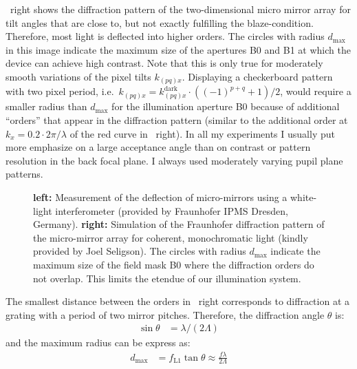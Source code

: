 ~right shows the diffraction pattern of the
two-dimensional micro mirror array for tilt angles that are close to,
but not exactly fulfilling the blaze-condition. Therefore, most light
is deflected into higher orders. The circles with radius
$d_\textrm{max}$ in this image indicate the maximum size of the
apertures B0 and B1 at which the device can achieve high
contrast. Note that this is only true for moderately smooth variations
of the pixel tilts $k_{(pq)x}$. Displaying a checkerboard pattern with
two pixel period, i.e.\ $k_{(pq)x} = k_{(pq)x}^\textrm{dark} \cdot
((-1)^{p+q}+1)/2$, would require a smaller radius than
$d_\textrm{max}$ for the illumination aperture B0 because of
additional ``orders'' that appear in the diffraction pattern (similar
to the additional order at $k_x=0.2\cdot 2\pi/\lambda$ of the red
curve in ~right).  In all my
experiments I usually put more emphasize on a large acceptance angle
than on contrast or pattern resolution in the back focal plane. I
always used moderately varying pupil plane patterns.
\begin{figure}[!hbt]
  \centering
  \caption{{\bf left:} Measurement of the deflection of micro-mirrors
    using a white-light interferometer (provided by Fraunhofer IPMS
    Dresden, Germany). {\bf right:} Simulation of the Fraunhofer
    diffraction pattern of the micro-mirror array for coherent,
    monochromatic light (kindly provided by Joel Seligson). The
    circles with radius $d_\textrm{max}$ indicate the maximum size of
    the field mask B0 where the diffraction orders do not
    overlap. This limits the etendue of our illumination system.}
  \label{fig:mma-fft}
\end{figure}


The smallest distance between the orders in
~right \label{sec:etendue-mma} corresponds to
diffraction at a grating with a period of two mirror
pitches. Therefore, the diffraction angle $\theta$ is:
\begin{align}
  \sin\theta&=\lambda/(2 \Lambda)
\end{align}
and the maximum radius can be express as:
\begin{align}
  d_\textrm{max} &= f_\textrm{L1} \tan\theta \approx \frac{f\lambda}{ 2 \Lambda}
\end{align}


